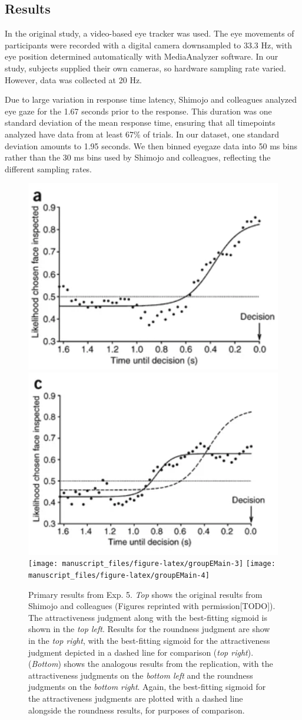 \documentclass[
  man,floatsintext]{apa6}
\begin{document}
\subsection{Results}\label{results-5}

In the original study, a video-based eye tracker was used. The eye
movements of participants were recorded with a digital camera
downsampled to 33.3 Hz, with eye position determined
automatically with MediaAnalyzer software. In our study, subjects
supplied their own cameras, so hardware sampling rate varied. However,
data was collected at 20 Hz.

Due to large variation in response time latency, Shimojo and colleagues analyzed eye gaze for the 1.67 seconds prior to the response. This duration was one standard deviation of the mean response time, ensuring that all timepoints analyzed have data from at least 67\% of trials. In our dataset, one standard deviation amounts to 1.95 seconds. We then binned eyegaze data into 50 ms bins rather than the 30 ms bins used by Shimojo and colleagues, reflecting the different sampling rates.



\begin{figure}
\includegraphics[width=0.45\linewidth]{figGroupEOrigA} \includegraphics[width=0.45\linewidth]{figGroupEOrigB} \texttt{[image: manuscript\_files/figure-latex/groupEMain-3]} \texttt{[image: manuscript\_files/figure-latex/groupEMain-4]} \caption{Primary results from Exp. 5. \emph{Top} shows the original results from Shimojo and colleagues (Figures reprinted with permission{[}TODO{]}). The attractiveness judgment along with the best-fitting sigmoid is shown in the \emph{top left}. Results for the roundness judgment are show in the \emph{top right}, with the best-fitting sigmoid for the attractiveness judgment depicted in a dashed line for comparison (\emph{top right}). (\emph{Bottom}) shows the analogous results from the replication, with the attractiveness judgments on the \emph{bottom left} and the roundness judgments on the \emph{bottom right}. Again, the best-fitting sigmoid for the attractiveness judgments are plotted with a dashed line alongside the roundness results, for purposes of comparison.}\label{fig:groupEMain}
\end{figure}
\end{document}
